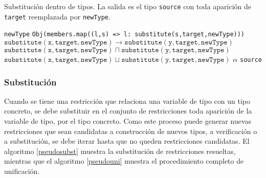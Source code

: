 \begin{algorithm}\captionsetup{labelsep=newline}
  \centering
  \caption{Substitución dentro de tipos. La salida es el tipo \texttt{source} con toda aparición de \texttt{target} reemplazada por \texttt{newType}.}
    \begin{algorithmic}[1]
      \label{pseudosubstitute}
            \State \Return \texttt{newType}
          \EndIf
              \State \Return \texttt{Obj(members.map((l,s) => {l: substitute(s,target,newType)}))}
            \EndCase
              \State \Return $\mathtt{substitute(x,target,newType)\rightarrow substitute(y,target,newType)}$
            \EndCase
              \State \Return $\mathtt{substitute(x,target,newType) \sqcap substitute(y,target,newType)}$
            \EndCase
              \State \Return $\mathtt{substitute(x,target,newType) \sqcup substitute(y,target,newType)}$
            \EndCase
            \Case{$\alpha$}
              \State \Return $\alpha$
            \EndCase
          \EndSwitch
      \State \Return \texttt{source}
      \EndFunction
    \end{algorithmic}
\end{algorithm}
\clearpage

\subsubsection{Substitución}
Cuando se tiene una restricción que relaciona una variable de tipo con un tipo concreto, se debe substituir en el conjunto de restricciones toda aparición de la variable de tipo, por el tipo concreto. Como este proceso puede generar nuevas restricciones que sean candidatas a construcción de nuevos tipos, a verificación o a substitución, se debe iterar hasta que no queden restricciones candidatas. El algoritmo \ref{pseudosubst} muestra la substitución de restricciones resueltas, mientras que el algoritmo \ref{pseudouni} muestra el procedimiento completo de unificación.


